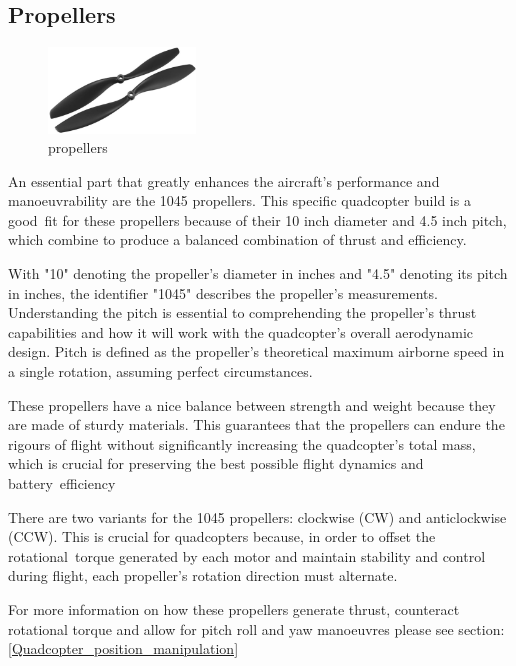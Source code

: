 \documentclass{article}
\begin{document}
\subsection{Propellers}
\begin{figure}[H]
  \centering
  \includegraphics[width=0.35\textwidth]{Pictures/props.png}
  \caption{propellers}
  \label{fig:propellers}
\end{figure}
An essential part that greatly enhances the aircraft's performance and manoeuvrability are the 1045 propellers. This specific quadcopter build is a good fit for these propellers because of their 10 inch diameter and 4.5 inch pitch, which combine to produce a balanced combination of thrust and efficiency. 

With "10" denoting the propeller's diameter in inches and "4.5" denoting its pitch in inches, the identifier "1045" describes the propeller's measurements. Understanding the pitch is essential to comprehending the propeller's thrust capabilities and how it will work with the quadcopter's overall aerodynamic design. Pitch is defined as the propeller's theoretical maximum airborne 
speed in a single rotation, assuming perfect circumstances.

These propellers have a nice balance between strength and weight because they are made of sturdy materials. This guarantees that the propellers can endure the rigours of flight without significantly increasing the quadcopter's total mass, which is crucial for preserving the best possible flight dynamics and battery efficiency 

There are two variants for the 1045 propellers: clockwise (CW) and anticlockwise (CCW). This is crucial for quadcopters because, in order to offset the rotational torque generated by each motor and maintain stability and control during flight, each propeller's rotation direction must alternate.

For more information on how these propellers generate thrust, counteract rotational torque and allow for pitch roll and yaw manoeuvres please see section:\ref{Quadcopter_position_manipulation}
\end{document}
